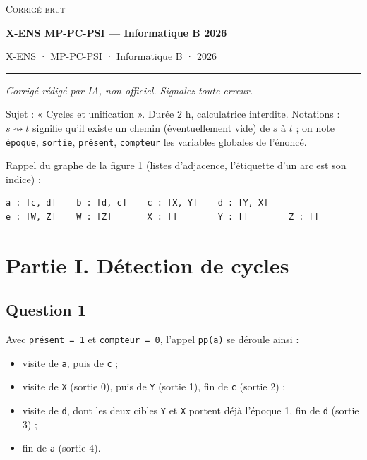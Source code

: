 \documentclass[11pt,a4paper]{article}
\providecommand{\tightlist}{\setlength{\itemsep}{0pt}\setlength{\parskip}{0pt}}
\begin{document}
\thispagestyle{plain}
\begin{center}
  {\small\scshape Corrigé brut}\par\smallskip
  {\LARGE\bfseries X-ENS MP-PC-PSI — Informatique B 2026\par}\medskip
  {\large X-ENS · MP-PC-PSI · Informatique B · 2026\par}
\end{center}
\vspace{2pt}\hrule\vspace{8pt}

\emph{Corrigé rédigé par IA, non officiel. Signalez toute erreur.}

Sujet : « Cycles et unification ». Durée 2 h, calculatrice interdite. Notations : \(s\rightsquigarrow t\) signifie qu'il existe un chemin (éventuellement vide) de \(s\) à \(t\) ; on note \texttt{époque}, \texttt{sortie}, \texttt{présent}, \texttt{compteur} les variables globales de l'énoncé.

Rappel du graphe de la figure 1 (listes d'adjacence, l'étiquette d'un arc est son indice) :

\begin{lstlisting}
a : [c, d]    b : [d, c]    c : [X, Y]    d : [Y, X]
e : [W, Z]    W : [Z]       X : []        Y : []        Z : []
\end{lstlisting}

\hypertarget{partie-i.-duxe9tection-de-cycles}{%
\section{Partie I. Détection de cycles}\label{partie-i.-duxe9tection-de-cycles}}

\hypertarget{question-1}{%
\subsection{Question 1}\label{question-1}}

Avec \texttt{présent\ =\ 1} et \texttt{compteur\ =\ 0}, l'appel \texttt{pp(\textquotesingle{}a\textquotesingle{})} se déroule ainsi :

\begin{itemize}
\tightlist
\item
  visite de \texttt{a}, puis de \texttt{c} ;
\item
  visite de \texttt{X} (sortie 0), puis de \texttt{Y} (sortie 1), fin de \texttt{c} (sortie 2) ;
\item
  visite de \texttt{d}, dont les deux cibles \texttt{Y} et \texttt{X} portent déjà l'époque 1, fin de \texttt{d} (sortie 3) ;
\item
  fin de \texttt{a} (sortie 4).
\end{itemize}
\end{document}
